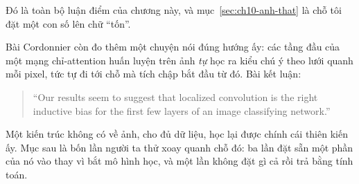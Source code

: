 Đó là toàn bộ luận điểm của chương này, và mục~\ref{sec:ch10-anh-that} là chỗ
tôi đặt một con số lên chữ \enquote{tốn}.

Bài Cordonnier còn đo thêm một chuyện nói đúng hướng ấy: các tầng đầu của một
mạng chỉ-attention huấn luyện trên ảnh \emph{tự} học ra kiểu chú ý theo lưới
quanh mỗi pixel, tức tự đi tới chỗ mà tích chập bắt đầu từ đó. Bài kết luận:

\begin{quote}
\enquote{Our results seem to suggest that localized convolution is the right
inductive bias for the first few layers of an image classifying network.}
\end{quote}

Một kiến trúc không có  về ảnh, cho đủ
dữ liệu, học lại được chính cái thiên kiến ấy. Mục sau là bốn lần người ta thử
xoay quanh chỗ đó: ba lần đặt sẵn một phần của nó vào thay vì bắt mô hình học,
và một lần không đặt gì cả rồi trả bằng tính toán.
